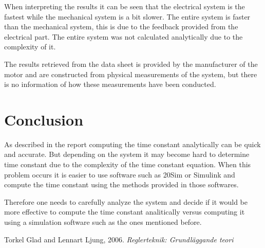 \documentclass[12pt,a4paper]{article}
\begin{document}
When interpreting the results it can be seen that the electrical system is the fastest while the mechanical system is a bit slower. The entire system is faster than the mechanical system, this is due to the feedback provided from the electrical part. The entire system was not calculated analytically due to the complexity of it.

The results retrieved from the data sheet is provided by the manufacturer of the motor and are constructed from physical measurements of the system, but there is no information of how these measurements have been conducted.

\section{Conclusion}
As described in the report computing the time constant analytically can be quick and accurate. But depending on the system it may become hard to determine time constant due to the complexity of the time constant equation. When this problem occurs it is easier to use software such as 20Sim or Simulink and compute the time constant using the methods provided in those softwares.

Therefore one needs to carefully analyze the system and decide if it would be more effective to compute the time constant analitically versus computing it using a simulation software such as the ones mentioned before.

\begin{thebibliography}{99}
 Torkel Glad and Lennart Ljung, 2006. \emph{Reglerteknik: Grundläggande teori}
\end{thebibliography}
\end{document}
